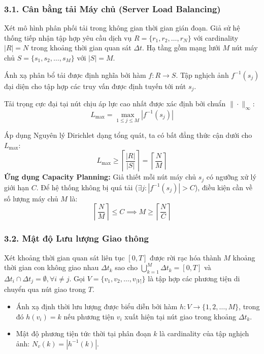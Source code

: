 \documentclass[12pt,a4paper]{article}
\theoremstyle{definition}
\begin{document}
\subsubsection*{3.1. Cân bằng tải Máy chủ (Server Load Balancing)}
Xét mô hình phân phối tải trong không gian thời gian gián đoạn. Giả sử hệ thống tiếp nhận tập hợp yêu cầu dịch vụ $R = \{r_1, r_2, \dots, r_N\}$ với cardinality $|R| = N$ trong khoảng thời gian quan sát $\Delta t$. Hạ tầng gồm mạng lưới $M$ nút máy chủ $S = \{s_1, s_2, \dots, s_M\}$ với $|S| = M$. 

\noindent Ánh xạ phân bổ tải được định nghĩa bởi hàm $f: R \to S$. Tập nghịch ảnh $f^{-1}(s_j)$ đại diện cho tập hợp các truy vấn được định tuyến tới nút $s_j$. 

\noindent Tải trọng cực đại tại nút chịu áp lực cao nhất được xác định bởi chuẩn $\| \cdot \|_\infty$:
\[
L_{\max} = \max_{1 \le j \le M} |f^{-1}(s_j)|
\]

\noindent Áp dụng Nguyên lý Dirichlet dạng tổng quát, ta có bất đẳng thức cận dưới cho $L_{\max}$:
\[
L_{\max} \ge \left\lceil \frac{|R|}{|S|} \right\rceil = \left\lceil \frac{N}{M} \right\rceil
\]
\textbf{Ứng dụng Capacity Planning:} Giả thiết mỗi nút máy chủ $s_j$ có ngưỡng xử lý giới hạn $C$. Để hệ thống không bị quá tải ($\exists j: |f^{-1}(s_j)| > C$), điều kiện cần về số lượng máy chủ $M$ là:
\[
\left\lceil \frac{N}{M} \right\rceil \le C \implies M \ge \left\lceil \frac{N}{C} \right\rceil
\]

\subsubsection*{3.2. Mật độ Lưu lượng Giao thông}
Xét khoảng thời gian quan sát liên tục $[0, T]$ được rời rạc hóa thành $M$ khoảng thời gian con không giao nhau $\Delta t_k$ sao cho $\bigcup_{k=1}^M \Delta t_k = [0, T]$ và $\Delta t_i \cap \Delta t_j = \emptyset, \forall i \neq j$. Gọi $V = \{v_1, v_2, \dots, v_{|V|}\}$ là tập hợp các phương tiện di chuyển qua nút giao trong $T$.

\begin{itemize}[leftmargin=1.2cm, itemsep=3pt, topsep=2pt]
    \item Ánh xạ định thời lưu lượng được biểu diễn bởi hàm $h: V \to \{1, 2, \dots, M\}$, trong đó $h(v_i) = k$ nếu phương tiện $v_i$ xuất hiện tại nút giao trong khoảng $\Delta t_k$.
    \item Mật độ phương tiện tức thời tại phân đoạn $k$ là cardinality của tập nghịch ảnh: $N_v(k) = |h^{-1}(k)|$.
\end{itemize}
\end{document}
